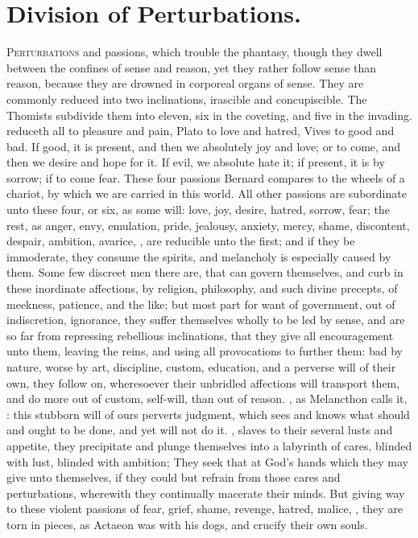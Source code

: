 {{%
\section{Division of Perturbations.}

\lettrine{P}{erturbations} and passions, which trouble the phantasy, though they
dwell between the confines of sense and reason, yet they rather follow
sense than reason, because they are drowned in corporeal organs of
sense. They are commonly reduced into two inclinations, irascible
and concupiscible. The Thomists subdivide them into eleven, six in the
coveting, and five in the invading. \Aristotle reduceth all to pleasure
and pain, Plato to love and hatred, Vives to good and bad. If
good, it is present, and then we absolutely joy and love; or to come,
and then we desire and hope for it. If evil, we absolute hate it; if
present, it is by sorrow; if to come fear. These four passions
Bernard compares to the wheels of a chariot, by which we are
carried in this world. All other passions are subordinate unto these
four, or six, as some will: love, joy, desire, hatred, sorrow, fear;
the rest, as anger, envy, emulation, pride, jealousy, anxiety, mercy,
shame, discontent, despair, ambition, avarice, \etc{}, are reducible unto
the first; and if they be immoderate, they consume the spirits,
and melancholy is especially caused by them. Some few discreet men
there are, that can govern themselves, and curb in these inordinate
affections, by religion, philosophy, and such divine precepts, of
meekness, patience, and the like; but most part for want of government,
out of indiscretion, ignorance, they suffer themselves wholly to be led
by sense, and are so far from repressing rebellious inclinations, that
they give all encouragement unto them, leaving the reins, and using all
provocations to further them: bad by nature, worse by art, discipline,
custom, education, and a perverse will of their own, they follow
on, wheresoever their unbridled affections will transport them, and do
more out of custom, self-will, than out of reason. ,
as Melancthon calls it, : this stubborn will of ours
perverts judgment, which sees and knows what should and ought to be
done, and yet will not do it. , slaves to their several
lusts and appetite, they precipitate and plunge themselves into a
labyrinth of cares, blinded with lust, blinded with ambition;
They seek that at God's hands which they may give unto
themselves, if they could but refrain from those cares and
perturbations, wherewith they continually macerate their minds. But
giving way to these violent passions of fear, grief, shame, revenge,
hatred, malice, \etc{}, they are torn in pieces, as Actaeon was with his
dogs, and crucify their own souls.

}}
